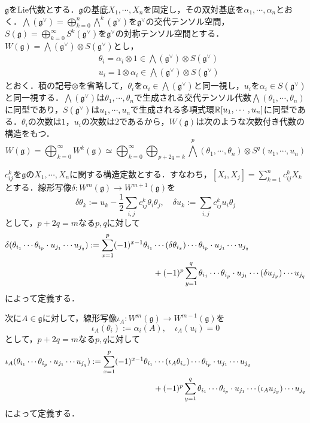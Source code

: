 \begin{eg}
$\mathfrak{g}$をLie代数とする．$\mathfrak{g}$の基底$X_1,\cdots,X_n$を固定し，その双対基底を$\alpha_1,\cdots,\alpha_n$とおく．$\bigwedge(\mathfrak{g}^\vee)=\bigoplus_{k=0}^{n}\bigwedge^k(\mathfrak{g}^\vee)$を$\mathfrak{g}^\vee$の交代テンソル空間，$S(\mathfrak{g})=\bigoplus_{k=0}^\infty S^k(\mathfrak{g}^\vee)$を$\mathfrak{g}^\vee$の対称テンソル空間とする．$W(\mathfrak{g})=\bigwedge(\mathfrak{g}^\vee)\otimes S(\mathfrak{g}^\vee)$とし，
\begin{align*}
  &\theta_i = \alpha_i\otimes 1 \in\bigwedge(\mathfrak{g}^\vee)\otimes S(\mathfrak{g}^\vee)\\
  &u_i = 1\otimes\alpha_i \in\bigwedge(\mathfrak{g}^\vee)\otimes S(\mathfrak{g}^\vee)
\end{align*}
とおく．積の記号$\otimes$を省略して，$\theta_i$を$\alpha_i\in\bigwedge(\mathfrak{g}^\vee)$と同一視し，$u_i$を$\alpha_i\in S(\mathfrak{g}^\vee)$と同一視する．$\bigwedge(\mathfrak{g}^\vee)$は$\theta_1,\cdots,\theta_n$で生成される交代テンソル代数$\bigwedge(\theta_1,\cdots,\theta_n)$に同型であり，$S(\mathfrak{g}^\vee)$は$u_1,\cdots,u_n$で生成される多項式環$\mathbb{R}[u_1,\cdots,u_n]$に同型である．$\theta_i$の次数は$1$，$u_i$の次数は$2$であるから，$W(\mathfrak{g})$は次のような次数付き代数の構造をもつ．
\[
W(\mathfrak{g})= \bigoplus_{k=0}^\infty W^k(\mathfrak{g}) \simeq\bigoplus_{k=0}^\infty\bigoplus_{p+2q=k}\bigwedge^p(\theta_1,\cdots,\theta_n)\otimes S^q(u_1,\cdots,u_n)
\]

$c^k_{ij}$を$\mathfrak{g}$の$X_1,\cdots,X_n$に関する構造定数とする．すなわち，$[X_i,X_j]=\sum_{k=1}^nc^k_{ij}X_k$とする．線形写像$\delta\colon W^m(\mathfrak{g})\rightarrow W^{m+1}(\mathfrak{g})$を
\[
\delta\theta_k := u_k - \frac{1}{2}\sum_{i,j}c^k_{ij}\theta_i\theta_j,\quad \delta u_k := \sum_{i,j}c^k_{ij}u_i\theta_j
\]
として，$p+2q=m$なる$p,q$に対して
\begin{align*}
  \delta(\theta_{i_1}\cdots\theta_{i_p}\cdot u_{j_1}\cdots u_{j_q}) := \sum_{x=1}^p(-1)^{x-1}\theta_{i_1}&\cdots(\delta\theta_{i_x})\cdots\theta_{i_p}\cdot u_{j_1}\cdots u_{j_q} \notag \\ 
  &+ (-1)^p\sum_{y=1}^q\theta_{i_1}\cdots\theta_{i_p}\cdot u_{j_1}\cdots(\delta u_{j_y})\cdots u_{j_q}
\end{align*}
によって定義する．

次に$A\in\mathfrak{g}$に対して，線形写像$\iota_A\colon W^m(\mathfrak{g})\rightarrow W^{m-1}(\mathfrak{g})$を
\[
\iota_A(\theta_i):=\alpha_i(A),\quad \iota_A(u_i)=0
\]
として，$p+2q=m$なる$p,q$に対して
\begin{align*}
  \iota_A(\theta_{i_1}\cdots\theta_{i_p}\cdot u_{j_1}\cdots u_{j_q}) := \sum_{x=1}^p(-1)^{x-1}\theta_{i_1}&\cdots(\iota_A\theta_{i_x})\cdots\theta_{i_p}\cdot u_{j_1}\cdots u_{j_q} \notag \\ 
  &+ (-1)^p\sum_{y=1}^q\theta_{i_1}\cdots\theta_{i_p}\cdot u_{j_1}\cdots(\iota_A u_{j_y})\cdots u_{j_q}
\end{align*}
によって定義する．


\end{eg}
